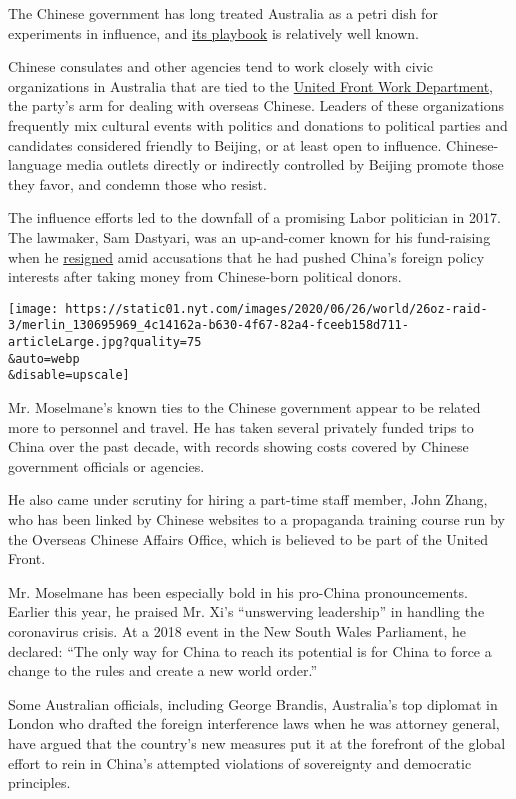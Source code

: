 The Chinese government has long treated Australia as a petri dish for
experiments in influence, and
\href{https://www.nytimes.com/2019/05/20/world/australia/australia-china.html}{its
playbook} is relatively well known.

Chinese consulates and other agencies tend to work closely with civic
organizations in Australia that are tied to the
\href{http://www.zytzb.gov.cn/}{United Front Work Department}, the
party's arm for dealing with overseas Chinese. Leaders of these
organizations frequently mix cultural events with politics and donations
to political parties and candidates considered friendly to Beijing, or
at least open to influence. Chinese-language media outlets directly or
indirectly controlled by Beijing promote those they favor, and condemn
those who resist.

The influence efforts led to the downfall of a promising Labor
politician in 2017. The lawmaker, Sam Dastyari, was an up-and-comer
known for his fund-raising when he
\href{https://www.nytimes.com/2017/12/12/world/australia/sam-dastyari-resigns-china.html}{resigned}
amid accusations that he had pushed China's foreign policy interests
after taking money from Chinese-born political donors.

\texttt{[image: https://static01.nyt.com/images/2020/06/26/world/26oz-raid-3/merlin\_130695969\_4c14162a-b630-4f67-82a4-fceeb158d711-articleLarge.jpg?quality=75\\\&auto=webp\\\&disable=upscale]}

Mr. Moselmane's known ties to the Chinese government appear to be
related more to personnel and travel. He has taken several privately
funded trips to China over the past decade, with records showing costs
covered by Chinese government officials or agencies.

He also came under scrutiny for hiring a part-time staff member, John
Zhang, who has been linked by Chinese websites to a propaganda training
course run by the Overseas Chinese Affairs Office, which is believed to
be part of the United Front.

Mr. Moselmane has been especially bold in his pro-China pronouncements.
Earlier this year, he praised Mr. Xi's ``unswerving leadership'' in
handling the coronavirus crisis. At a 2018 event in the New South Wales
Parliament, he declared: ``The only way for China to reach its potential
is for China to force a change to the rules and create a new world
order.''

Some Australian officials, including George Brandis, Australia's top
diplomat in London who drafted the foreign interference laws when he was
attorney general, have argued that the country's new measures put it at
the forefront of the global effort to rein in China's attempted
violations of sovereignty and democratic principles.

